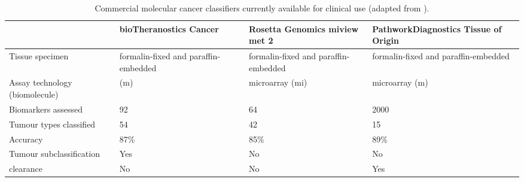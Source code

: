\begin{table}
  \footnotesize
  \centering
  \begin{tabular}{m{1.7cm}C{2.5cm}C{2.5cm}C{2.5cm}}
    \toprule
    & bioTheranostics Cancer  \textregistered{} & Rosetta
                                                                                Genomics
                                                                                miview met
                                                                                2\texttrademark{}
    & PathworkDiagnostics\textregistered{} Tissue of Origin\\
    \midrule
    Tissue \newline specimen & formalin-fixed and paraffin-embedded & formalin-fixed and
                                                                      paraffin-embedded &
                                                                                          formalin-fixed
                                                                                          and
                                                                                          paraffin-embedded\\
    Assay \newline technology (biomolecule) &  (m) & microarray
                                                                                      (mi) &
                                                                                                            microarray
                                                                                                            (m)\\
    Biomarkers assessed & 92 & 64 & 2000\\
    Tumour types classified & 54 & 42 & 15\\
    Accuracy & 87\% &  85\% & 89\% \\
    Tumour subclassification & Yes & No & No\\
     clearance & No & No & Yes\\
    \bottomrule
  \end{tabular}
  \caption[Commercial molecular cancer classifiers currently available for clinical use]{Commercial molecular cancer classifiers currently available for clinical use (adapted from \citealp{schnabel_gene_2012}).}
  \label{tab:molecular-classifiers}
\end{table}

